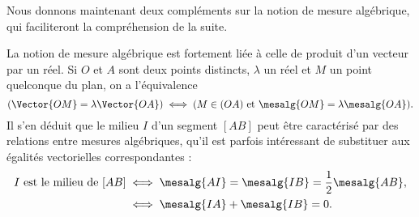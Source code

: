 Nous donnons maintenant deux compléments sur la notion de mesure algébrique, qui faciliteront la compréhension de la suite.

\begin{remark}
La notion de mesure algébrique est fortement liée à celle de produit d'un vecteur par un réel. Si $O$ et $A$ sont deux points distincts, $\lambda$ un réel et $M$ un point quelconque du plan, on a l'équivalence
\[
(\Vector{OM}=\lambda\Vector{OA})\iff(M\in (OA) \text{ et }\mesalg{OM}=\lambda\mesalg{OA}).
\]
Il s'en déduit que le milieu $I$ d'un segment $[AB]$ peut être caractérisé par des relations entre mesures algébriques, qu'il est parfois intéressant de substituer aux égalités vectorielles correspondantes :
\begin{align}
I \text{ est le milieu de }[AB]&\iff \mesalg{AI}=\mesalg{IB}=\frac12\mesalg{AB},\\
&\iff\mesalg{IA}+\mesalg{IB}=0.\label{eqcaracmilieu}
\end{align}
\end{remark}

